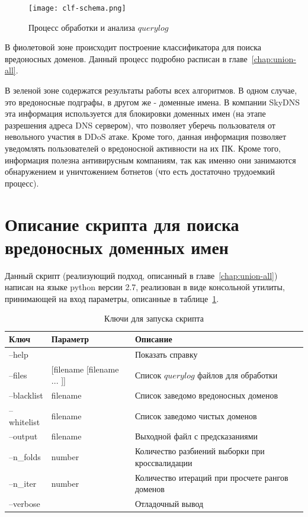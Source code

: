 \documentclass[a4paper,14pt]{extreport} %
\begin{document}
\begin{figure}[H]
	\center
	\texttt{[image: clf-schema.png]}
	\caption{Процесс обработки и анализа $querylog$}
			
	\label{fig:full-proc}
\end{figure}


В фиолетовой зоне происходит построение классификатора для поиска вредоносных доменов. Данный процесс подробно расписан в главе~\ref{chap:union-all}.

В зеленой зоне содержатся результаты работы всех алгоритмов. В одном случае, это вредоносные подграфы, в другом же - доменные имена. В компании SkyDNS эта информация используется для блокировки доменных имен (на этапе разрешения адреса DNS сервером), что позволяет уберечь пользователя от невольного участия в DDoS атаке. Кроме того, данная информация позволяет уведомлять пользователей о вредоносной активности на их ПК. Кроме того, информация полезна антивирусным компаниям, так как именно они занимаются обнаружением и уничтожением ботнетов (что есть достаточно трудоемкий процесс).
\section{Описание скрипта для поиска вредоносных доменных имен}
Данный скрипт (реализующий подход, описанный в главе~\ref{chap:union-all}) написан на языке python версии 2.7, реализован в виде консольной утилиты, принимающей на вход параметры, описанные в таблице~\ref{tab:keys}.
\begin{table}[H]
\centering
\caption{Ключи для запуска скрипта}
\label{tab:keys}
	\begin{tabular}{|p{3cm}|p{5cm}|p{7cm}|}
		\hline
		Ключ    & Параметр           & Описание                                                                           \\ \hline
		--help      &                            & Показать справку                                                            \\ \hline
		--files     & [filename [filename ... ]] & Список $querylog$ файлов для обработки                             \\ \hline
		--blacklist & filename                   & Список заведомо вредоносных доменов                        \\ \hline
		--whitelist & filename                   & Список заведомо чистых доменов                                  \\ \hline
		--output    & filename                   & Выходной файл с предсказаниями                                  \\ \hline
		--n\_folds  & number                     & Количество разбиений выборки при кроссвалидации \\ \hline
		--n\_iter   & number                     & Количество итераций при просчете рангов доменов  \\ \hline
		--verbose   &                            & Отладочный вывод                                                            \\ \hline
	\end{tabular}
\end{table}
\end{document}
